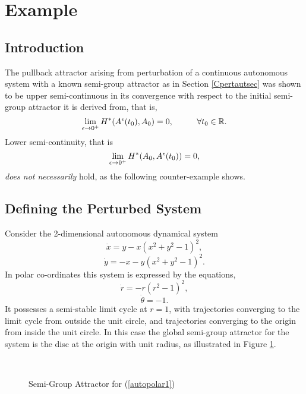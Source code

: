 
\section{Example}

\subsection{Introduction}

The pullback attractor arising from perturbation of a continuous autonomous
system with a known semi-group attractor as in Section \ref{Cpertautsec}
was shown to be upper semi-continuous in its convergence with respect to the
initial semi-group attractor it is derived from, that is,
\[ \lim_{\epsilon \rightarrow 0^{+}} H^{*}(A^{\epsilon}(t_{0}),A_{0}) = 0,
                      \hspace{1cm} \forall t_0 \in \mathbb{R}.  \]
Lower semi-continuity, that is
\[ \lim_{\epsilon \rightarrow 0^{+}} H^{*}(A_0, A^{\epsilon}(t_{0})) =
                                0, \]
{\em does not necessarily} hold, as the following counter-example
shows.

\subsection{Defining the Perturbed System}

Consider the 2-dimensional autonomous dynamical system
\begin{equation}
  \dot{x} = y - x(x^{2} + y^{2} - 1)^{2},
  \label{auto}
\end{equation}
\[ \dot{y} = -x - y(x^{2} + y^{2} - 1)^{2}. \]
In polar co-ordinates this system is expressed by the equations,
\begin{equation}
  \dot{r} = - r (r^{2} - 1)^2,
  \label{autopolar1}
\end{equation}
\[ \dot{\theta} = -1. \]
It possesses a semi-stable limit cycle at $r = 1$, with trajectories
converging to the limit cycle from outside the unit circle, and
trajectories converging to the origin from inside the unit circle. In this
case the global semi-group attractor for the system is the disc at the
origin with unit radius, as illustrated in Figure \ref{nlcapic}.

\begin{figure}[htb]
  \begin{center}
  \leavevmode
  \hbox{
  \epsfxsize=9.5cm
    }%
  \protect\caption{Semi-Group Attractor for (\ref{autopolar1})}
  \protect\label{nlcapic}
  \end{center}
\end{figure}

